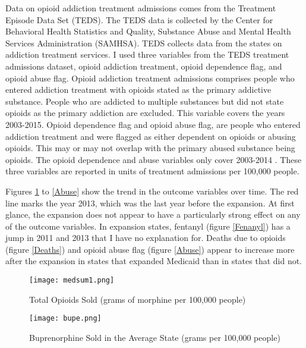 \documentclass[11pt]{article}
\begin{document}
Data on opioid addiction treatment admissions comes from the Treatment Episode Data Set (TEDS). The TEDS data is collected by the Center for Behavioral Health Statistics and Quality, Substance Abuse and Mental Health Services Administration (SAMHSA).  TEDS collects data from the states on addiction treatment services.  I used three variables from the TEDS treatment admissions dataset, opioid addiction treatment, opioid dependence flag, and opioid abuse flag.  Opioid addiction treatment admissions comprises people who entered addiction treatment with opioids stated as the primary addictive substance.  People who are addicted to multiple substances but did not state opioids as the primary addiction are excluded. This variable covers the years 2003-2015.  Opioid dependence flag and opioid abuse flag, are people who entered addiction treatment and were flagged as either dependent on opioids or abusing opioids.  This may or may not overlap with the primary abused substance being opioids.  The opioid dependence and abuse variables only cover 2003-2014 \citep{SubstanceAbuseandMentalHealthServicesAdministration1015}.  These three variables are reported in units of treatment admissions per 100,000 people.


Figures \ref{Total Opioids Sold} to \ref{Abuse} 
show the trend in the outcome variables over time.  The red line marks the year 2013, which was the last year before the expansion.  At first glance, the expansion does not appear to have a particularly strong effect on any of the outcome variables. In expansion states, fentanyl (figure \ref{Fenanyl}) has a jump in 2011 and 2013 that I have no explanation for. Deaths due to opioids (figure \ref{Deaths}) and opioid abuse flag (figure \ref{Abuse}) appear to increase more after the expansion in states that expanded Medicaid than in states that did not.  

\clearpage

\begin{figure}
\begin{center}
  \texttt{[image: medsum1.png]}
  \caption{Total Opioids Sold (grams of morphine per 100,000 people)}
  \label{Total Opioids Sold}
  \end{center}
\end{figure}

\begin{figure} 
\begin{center}
  \texttt{[image: bupe.png]}
  \caption{Buprenorphine Sold in the Average State (grams per 100,000 people)}
  \label{Buprenorphine}
   \end{center}
\end{figure}
\end{document}
